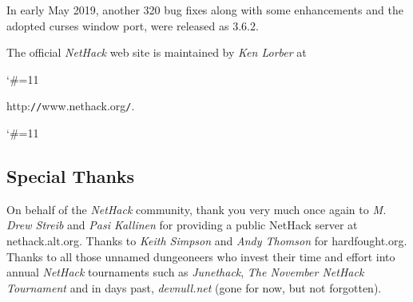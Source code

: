 \medskip
In early May 2019, another 320 bug fixes along with some enhancements and 
the adopted curses window port, were released as 3.6.2.

\medskip
\nd The official {\it NetHack\/} web site is maintained by {\it Ken Lorber} at
{\catcode`\#=11
}
http:{\tt /}{\tt /}www.nethack.org{\tt /}.
{\catcode`\#=11
}


\subsection*{Special Thanks}
\nd On behalf of the {\it NetHack\/} community, thank you very much once
again to {\it M. Drew Streib} and {\it Pasi Kallinen} for providing a
public NetHack server at nethack.alt.org. Thanks to {\it Keith Simpson}
and {\it Andy Thomson} for hardfought.org. Thanks to all those
unnamed dungeoneers who invest their time and effort into annual
{\it NetHack\/} tournaments such as {\it Junethack}, 
{\it The November NetHack Tournament} and in days past,
{\it devnull.net\/} (gone for now, but not forgotten).
\clearpage

